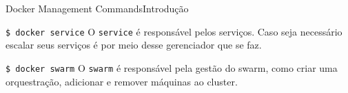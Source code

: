 \documentclass[10pt]{beamer}
\begin{document}
\begin{frame}{Docker Management Commands}{Introdução}
    \begin{block}{\texttt{\$ docker service}}
        O \texttt{service} é responsável pelos serviços. Caso seja necessário escalar seus serviços é por meio desse gerenciador que se faz.\\
        \centering
        \indent{}
    \end{block}
    \pause
    \begin{block}{\texttt{\$ docker swarm}}
        O \texttt{swarm} é responsável pela gestão do swarm, como criar uma orquestração, adicionar e remover máquinas ao cluster.\\
        \centering
        \indent{}
    \end{block}
\end{frame}

        
        

\end{document}

